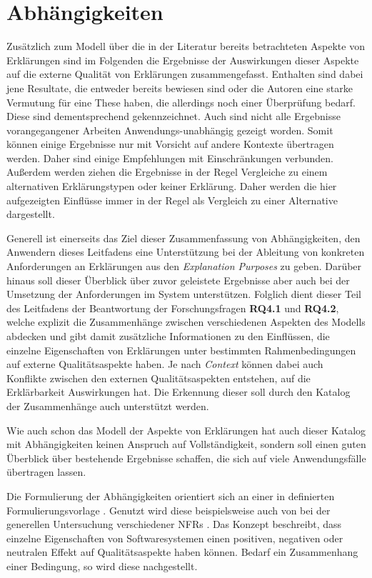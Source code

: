 \section{Abhängigkeiten}
\label{sec:model_proved_relations}

Zusätzlich zum Modell über die in der Literatur bereits betrachteten Aspekte von Erklärungen sind im Folgenden die Ergebnisse der Auswirkungen dieser Aspekte auf die externe Qualität von Erklärungen zusammengefasst. Enthalten sind dabei jene Resultate, die entweder bereits bewiesen sind oder die Autoren eine starke Vermutung für eine These haben, die allerdings noch einer Überprüfung bedarf. Diese sind dementsprechend gekennzeichnet. Auch sind nicht alle Ergebnisse vorangegangener Arbeiten Anwendungs-unabhängig gezeigt worden. Somit können einige Ergebnisse nur mit Vorsicht auf andere Kontexte übertragen werden. Daher sind einige Empfehlungen mit Einschränkungen verbunden. Außerdem werden ziehen die Ergebnisse in der Regel Vergleiche zu einem alternativen Erklärungstypen oder keiner Erklärung. Daher werden die hier aufgezeigten Einflüsse immer in der Regel als Vergleich zu einer Alternative dargestellt.

Generell ist einerseits das Ziel dieser Zusammenfassung von Abhängigkeiten, den Anwendern dieses Leitfadens eine Unterstützung bei der Ableitung von konkreten Anforderungen an Erklärungen aus den \textit{Explanation Purposes} zu geben. Darüber hinaus soll dieser Überblick über zuvor geleistete Ergebnisse aber auch bei der Umsetzung der Anforderungen im System unterstützen. Folglich dient dieser Teil des Leitfadens der Beantwortung der Forschungsfragen \textbf{RQ4.1} und \textbf{RQ4.2}, welche explizit die Zusammenhänge zwischen verschiedenen Aspekten des Modells abdecken und gibt damit zusätzliche Informationen zu den Einflüssen, die einzelne Eigenschaften von Erklärungen unter bestimmten Rahmenbedingungen auf externe Qualitätsaspekte haben. Je nach \textit{Context} können dabei auch Konflikte zwischen den externen Qualitätsaspekten entstehen, auf die Erklärbarkeit Auswirkungen hat. Die Erkennung dieser soll durch den Katalog der Zusammenhänge auch unterstützt werden.

Wie auch schon das Modell der Aspekte von Erklärungen hat auch dieser Katalog mit Abhängigkeiten keinen Anspruch auf Vollständigkeit, sondern soll einen guten Überblick über bestehende Ergebnisse schaffen, die sich auf viele Anwendungsfälle übertragen lassen.

Die Formulierung der Abhängigkeiten orientiert sich an einer in  definierten Formulierungsvorlage \cite{international2011iso}. Genutzt wird diese beispielsweise auch von \citeauthor{carvalho2020developers} bei der generellen Untersuchung verschiedener NFRs \cite{carvalho2020developers}. Das Konzept beschreibt, dass einzelne Eigenschaften von Softwaresystemen einen positiven, negativen oder neutralen Effekt auf Qualitätsaspekte haben können. Bedarf ein Zusammenhang einer Bedingung, so wird diese nachgestellt.


